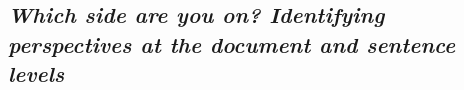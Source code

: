 

\subsection{\emph{Which side are you on? Identifying perspectives at the document and sentence levels}}
\label{sec:lin-et-al}

